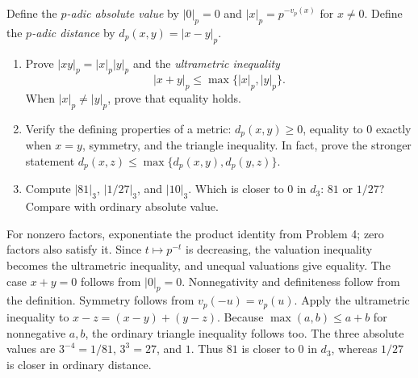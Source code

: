 Define the \emph{$p$-adic absolute value} by $|0|_p=0$ and
$|x|_p=p^{-v_p(x)}$ for $x\ne0$. Define the \emph{$p$-adic distance}
by $d_p(x,y)=|x-y|_p$.
\begin{enumerate}
 \item Prove $|xy|_p=|x|_p|y|_p$ and the \emph{ultrametric inequality}
 \[
 |x+y|_p\le\max\{|x|_p,|y|_p\}.
 \]
 When $|x|_p\ne|y|_p$, prove that equality holds. 
 \item Verify the defining properties of a metric: $d_p(x,y)\ge0$,
 equality to $0$ exactly when $x=y$, symmetry, and the triangle inequality.
 In fact, prove the stronger statement
 $d_p(x,z)\le\max\{d_p(x,y),d_p(y,z)\}$.
 \item Compute $|81|_3$, $|1/27|_3$, and $|10|_3$.
 Which is closer to $0$ in $d_3$: $81$ or $1/27$?
 Compare with ordinary absolute value. 
\end{enumerate}
\begin{solution}
For nonzero factors, exponentiate the product identity from Problem 4;
zero factors also satisfy it. Since $t\mapsto p^{-t}$ is decreasing,
the valuation inequality becomes the ultrametric inequality, and unequal
valuations give equality. The case $x+y=0$ follows from $|0|_p=0$.
Nonnegativity and definiteness follow from the definition. Symmetry follows
from $v_p(-u)=v_p(u)$. Apply the ultrametric inequality to
$x-z=(x-y)+(y-z)$. Because $\max(a,b)\le a+b$ for nonnegative $a,b$,
the ordinary triangle inequality follows too.
The three absolute values are $3^{-4}=1/81$, $3^3=27$, and $1$.
Thus $81$ is closer to $0$ in $d_3$, whereas $1/27$ is closer in ordinary distance.
\end{solution}

